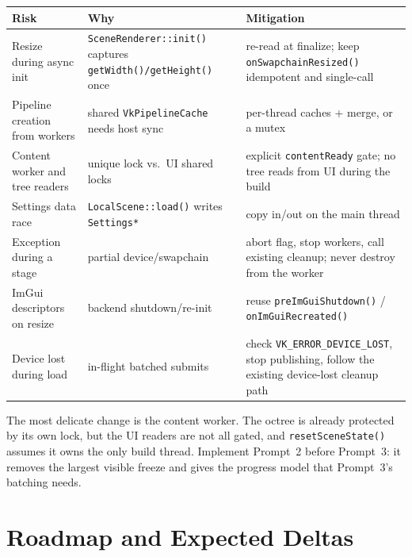 \documentclass[11pt,a4paper]{article}
\begin{document}
\begin{table}[h]
\centering
\small
\begin{tabular}{@{}L{4.6cm}L{5.4cm}L{5.4cm}@{}}
\toprule
\textbf{Risk} & \textbf{Why} & \textbf{Mitigation} \\
\midrule
Resize during async init & \texttt{SceneRenderer::init()} captures
\texttt{getWidth()/getHeight()} once & re-read at finalize; keep
\texttt{onSwapchainResized()} idempotent and single-call \\
Pipeline creation from workers & shared \texttt{VkPipelineCache} needs host
sync & per-thread caches + merge, or a mutex \\
Content worker and tree readers & unique lock vs.\ UI shared locks & explicit
\texttt{contentReady} gate; no tree reads from UI during the build \\
Settings data race & \texttt{LocalScene::load()} writes \texttt{Settings*} &
copy in/out on the main thread \\
Exception during a stage & partial device/swapchain & abort flag, stop
workers, call existing cleanup; never destroy from the worker \\
ImGui descriptors on resize & backend shutdown/re-init & reuse
\texttt{preImGuiShutdown()} / \texttt{onImGuiRecreated()} \\
Device lost during load & in-flight batched submits & check
\texttt{VK\_ERROR\_DEVICE\_LOST}, stop publishing, follow the existing
device-lost cleanup path \\
\bottomrule
\end{tabular}
\end{table}

The most delicate change is the content worker. The octree is already protected
by its own lock, but the UI readers are not all gated, and
\texttt{resetSceneState()} assumes it owns the only build thread. Implement
Prompt~2 before Prompt~3: it removes the largest visible freeze and gives the
progress model that Prompt~3's batching needs.

\section{Roadmap and Expected Deltas}
\end{document}
